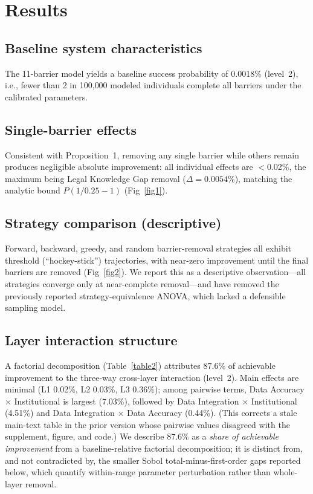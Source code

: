 \documentclass[10pt,letterpaper]{article}
\begin{document}
\section*{Results}

\subsection*{Baseline system characteristics}
The 11-barrier model yields a baseline success probability of 0.0018\% (level~2), i.e., fewer than 2 in 100{,}000 modeled individuals complete all barriers under the calibrated parameters.

\subsection*{Single-barrier effects}
Consistent with Proposition~1, removing any single barrier while others remain produces negligible absolute improvement: all individual effects are $<$0.02\%, the maximum being Legal Knowledge Gap removal ($\Delta=0.0054\%$), matching the analytic bound $P(1/0.25-1)$ (Fig~\ref{fig1}).

\subsection*{Strategy comparison (descriptive)}
Forward, backward, greedy, and random barrier-removal strategies all exhibit threshold (``hockey-stick'') trajectories, with near-zero improvement until the final barriers are removed (Fig~\ref{fig2}). We report this as a descriptive observation---all strategies converge only at near-complete removal---and have removed the previously reported strategy-equivalence ANOVA, which lacked a defensible sampling model.

\subsection*{Layer interaction structure}
A factorial decomposition (Table~\ref{table2}) attributes 87.6\% of achievable improvement to the three-way cross-layer interaction (level~2). Main effects are minimal (L1 0.02\%, L2 0.03\%, L3 0.36\%); among pairwise terms, Data Accuracy $\times$ Institutional is largest (7.03\%), followed by Data Integration $\times$ Institutional (4.51\%) and Data Integration $\times$ Data Accuracy (0.44\%). (This corrects a stale main-text table in the prior version whose pairwise values disagreed with the supplement, figure, and code.) We describe 87.6\% as a \emph{share of achievable improvement} from a baseline-relative factorial decomposition; it is distinct from, and not contradicted by, the smaller Sobol total-minus-first-order gaps reported below, which quantify within-range parameter perturbation rather than whole-layer removal.
\end{document}
